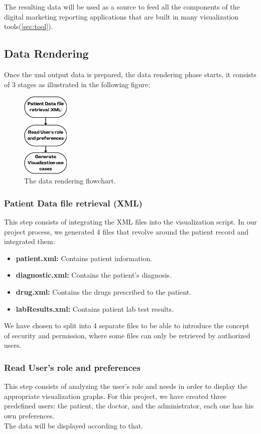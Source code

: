 \bigbreak
The resulting data will be used as a source to feed all the components of the digital marketing reporting applications that are built in many visualization tools(\ref{sec:tool}).

\subsection{Data Rendering}

Once the xml output data is prepared, the data rendering phase starts, it consists of 3 stages as illustrated in the following figure:

\begin{figure}[h!]
  \center
  \includegraphics[width=0.20\textwidth]{images/chapter3/rendering.png}
  \caption{The data rendering flowchart.}
  \label{fig:rendering}
\end{figure}

\subsubsection*{Patient Data file retrieval (XML)}
This step consists of integrating the XML files into the visualization script. In our project process, we generated 4 files that revolve around the patient record and integrated them:
\begin{itemize}
  \renewcommand{\labelitemi}{$\bullet$}
  \item \textbf{patient.xml: }Contains patient information.
  \item \textbf{diagnostic.xml: }Contains the patient's diagnosis.
  \item \textbf{drug.xml: }Contains the drugs prescribed to the patient.
  \item \textbf{labResults.xml: }Contains patient lab test results.
\end{itemize}
We have chosen to split into 4 separate files to be able to introduce the concept of security and permission, where some files can only be retrieved by authorized users.
\subsubsection*{Read User's role and preferences}
This step consists of analyzing the user's role and needs in order to display the appropriate visualization graphs. For this project, we have created three predefined users: the patient, the doctor, and the administrator, each one has his own preferences.\\
The data will be displayed according to that.

